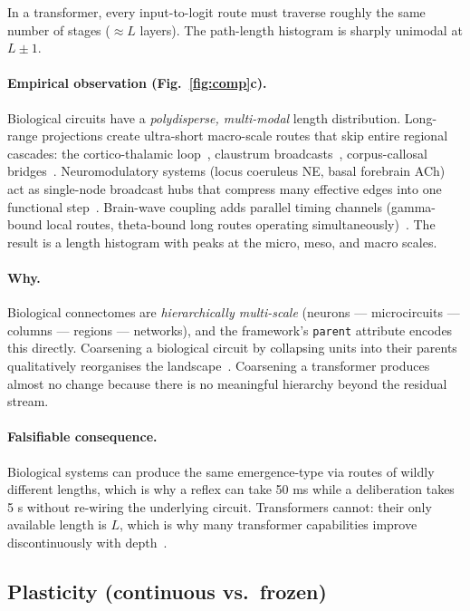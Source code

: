 \documentclass[11pt,a4paper]{article}
\begin{document}
In a transformer, every input-to-logit route must traverse roughly
the same number of stages ($\approx L$ layers). The path-length
histogram is sharply unimodal at $L \pm 1$.

\paragraph{Empirical observation (Fig.~\ref{fig:comp}c).} Biological
circuits have a \emph{polydisperse, multi-modal} length distribution.
Long-range projections create ultra-short macro-scale routes that
skip entire regional cascades: the cortico-thalamic loop~\cite{sherman2007},
claustrum broadcasts~\cite{crick2005}, corpus-callosal
bridges~\cite{aboitiz1992}. Neuromodulatory systems (locus coeruleus
NE, basal forebrain ACh) act as single-node broadcast hubs that
compress many effective edges into one functional
step~\cite{aston2005adaptive,sara2009locus}. Brain-wave coupling
adds parallel timing channels (gamma-bound local routes, theta-bound
long routes operating
simultaneously)~\cite{fries2005communication,buzsaki2006rhythms}.
The result is a length histogram with peaks at the micro, meso, and
macro scales.

\paragraph{Why.} Biological connectomes are \emph{hierarchically
multi-scale} (neurons --- microcircuits --- columns --- regions ---
networks), and the framework's \texttt{parent} attribute encodes this
directly. Coarsening a biological circuit by collapsing units into
their parents qualitatively reorganises the
landscape~\cite{markov2014weighted,sporns2013network}. Coarsening a
transformer produces almost no change because there is no meaningful
hierarchy beyond the residual stream.

\paragraph{Falsifiable consequence.} Biological systems can produce
the same emergence-type via routes of wildly different lengths,
which is why a reflex can take 50 ms while a deliberation takes 5 s
without re-wiring the underlying circuit. Transformers cannot:
their only available length is $L$, which is why many transformer
capabilities improve discontinuously with
depth~\cite{wei2022emergent}.

\subsection{Plasticity (continuous vs.\ frozen)}
\end{document}
